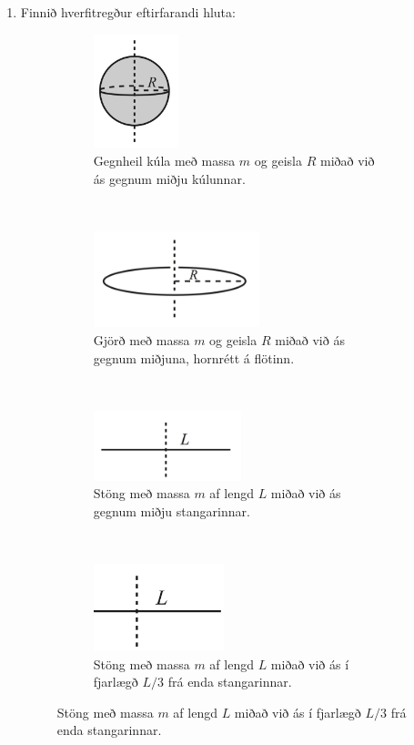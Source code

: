 \ifdefined \wholebook \else\documentclass[oneside]{book}\usepackage{EdlBook}\graphicspath{{figures/}}
\begin{document}
\begin{enumerate}[label = \textbf{Dæmi \thechapter.\arabic*.}]
\item Finnið hverfitregður eftirfarandi hluta:

\vspace{0.3cm}

\begin{figure}[h]
    \centering
    \begin{subfigure}[t]{0.4\textwidth}
        \centering
        \includegraphics[height=1.3in]{images/gkula.png}
        \caption{Gegnheil kúla með massa $m$ og geisla $R$ miðað við ás gegnum miðju kúlunnar.}
    \end{subfigure}
    ~ 
    \begin{subfigure}[t]{0.4\textwidth}
        \centering
        \includegraphics[height=1.1in]{images/gjord.png}
        \caption{Gjörð með massa $m$ og geisla $R$ miðað við ás gegnum miðjuna, hornrétt á flötinn.}
    \end{subfigure}
    ~ 
    \begin{subfigure}[t]{0.4\textwidth}
        \centering
        \includegraphics[height=0.8in]{images/stong.png}
        \caption{Stöng með massa $m$ af lengd $L$ miðað við ás gegnum miðju stangarinnar.}
    \end{subfigure}
    ~ 
    \begin{subfigure}[t]{0.4\textwidth}
        \centering
        \includegraphics[height=1in]{images/steinerston.png}
        \caption{Stöng með massa $m$ af lengd $L$ miðað við ás í fjarlægð $L/3$ frá enda stangarinnar.}
    \end{subfigure}
\end{figure}


\end{enumerate}
\end{document}
